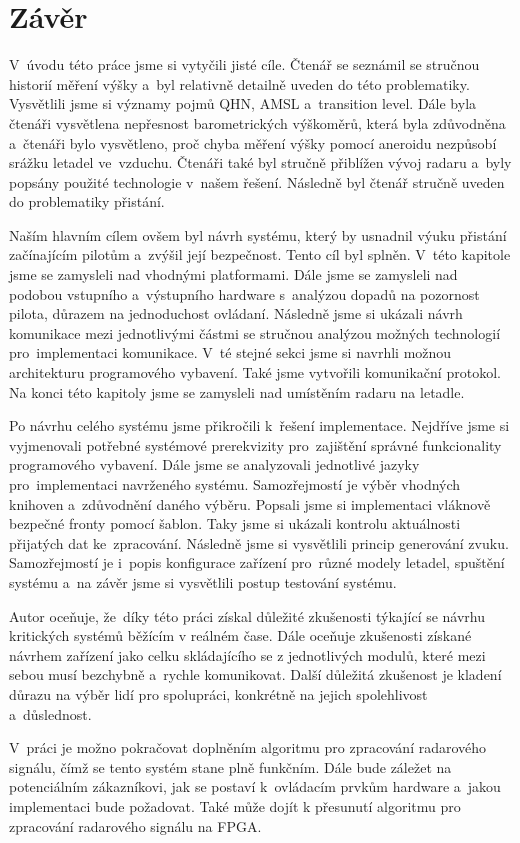 \chapter{Závěr}
	V~úvodu této práce jsme si vytyčili jisté cíle. Čtenář se seznámil se stručnou historií měření výšky a~byl relativně detailně uveden do této problematiky. Vysvětlili jsme si významy pojmů QHN, AMSL a~transition level. Dále byla čtenáři vysvětlena nepřesnost barometrických výškoměrů, která byla zdůvodněna a~čtenáři bylo vysvětleno, proč chyba měření výšky pomocí aneroidu nezpůsobí srážku letadel ve~vzduchu.
	Čtenáři také byl stručně přiblížen vývoj radaru a~byly popsány použité technologie v~našem řešení. Následně byl čtenář stručně uveden do problematiky přistání.\par
	Naším hlavním cílem ovšem byl návrh systému, který by usnadnil výuku přistání začínajícím pilotům a~zvýšil její bezpečnost. Tento cíl byl splněn. V~této kapitole jsme se zamysleli nad vhodnými platformami. Dále jsme se zamysleli nad podobou vstupního a~výstupního hardware s~analýzou dopadů na pozornost pilota, důrazem na jednoduchost ovládaní. Následně jsme si ukázali návrh komunikace mezi jednotlivými částmi se stručnou analýzou možných technologií pro~implementaci komunikace. V~té stejné sekci jsme si navrhli možnou architekturu programového vybavení. Také jsme vytvořili komunikační protokol. Na konci této kapitoly jsme se zamysleli nad umístěním radaru na letadle.\par
	Po návrhu celého systému jsme přikročili k~řešení implementace. Nejdříve jsme si vyjmenovali potřebné systémové prerekvizity pro~zajištění správné funkcionality programového vybavení. Dále jsme se analyzovali jednotlivé jazyky pro~implementaci navrženého systému. Samozřejmostí je výběr vhodných knihoven a~zdůvodnění daného výběru. Popsali jsme si implementaci vláknově bezpečné fronty pomocí šablon. Taky jsme si ukázali kontrolu aktuálnosti přijatých dat ke~zpracování. Následně jsme si vysvětlili princip generování zvuku. Samozřejmostí je i~popis konfigurace zařízení pro~různé modely letadel, spuštění systému a~na závěr jsme si vysvětlili postup testování systému.\par
	Autor oceňuje, že~díky této práci získal důležité zkušenosti týkající se návrhu kritických systémů běžícím v reálném čase. Dále oceňuje zkušenosti získané návrhem zařízení jako celku skládajícího se z jednotlivých modulů, které mezi sebou musí bezchybně a~rychle komunikovat. Další důležitá zkušenost je kladení důrazu na výběr lidí pro spolupráci, konkrétně na jejich spolehlivost a~důslednost.\par
	V~práci je možno pokračovat doplněním algoritmu pro zpracování radarového signálu, čímž se tento systém stane plně funkčním. Dále bude záležet na potenciálním zákazníkovi, jak se postaví k~ovládacím prvkům hardware a~jakou implementaci bude požadovat. Také může dojít k přesunutí algoritmu pro zpracování radarového signálu na FPGA.